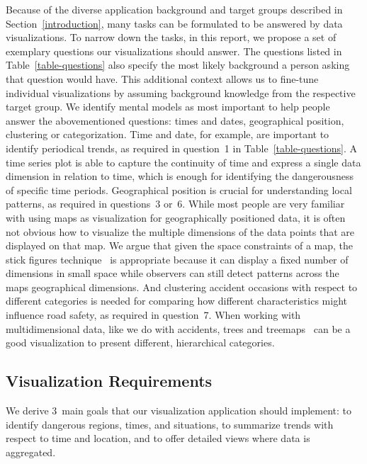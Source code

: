 Because of the diverse application background and target groups described in Section~\ref{introduction}, many tasks can be formulated to be answered by data visualizations. To narrow down the tasks, in this report, we propose a set of exemplary questions our visualizations should answer. The questions listed in Table~\ref{table-questions} also specify the most likely background a person asking that question would have. This additional context allows us to fine-tune individual visualizations by assuming background knowledge from the respective target group.
We identify  mental models as most important to help people answer the abovementioned questions: \Ni times and dates, \Nii geographical position, \Niii clustering or categorization.
Time and date, for example, are important to identify periodical trends, as required in question~1 in Table~\ref{table-questions}. A time series plot is able to capture the continuity of time and express a single data dimension in relation to time, which is enough for identifying the dangerousness of specific time periods.
Geographical position is crucial for understanding local patterns, as required in questions~3 or~6. While most people are very familiar with using maps as visualization for geographically positioned data, it is often not obvious how to visualize the multiple dimensions of the data points that are displayed on that map. We argue that given the space constraints of a map, the stick figures technique~\cite{PickettG1988} is appropriate because it can display a fixed number of dimensions in small space while observers can still detect patterns across the maps geographical dimensions.
And clustering accident occasions with respect to different categories is needed for comparing how different characteristics might influence road safety, as required in question~7. When working with multidimensional data, like we do with accidents, trees and treemaps~\cite{Shneiderman1992} can be a good visualization to present different, hierarchical categories.

\subsection{Visualization Requirements}
\label{requirements}
We derive 3~main goals that our visualization application should implement: \Ni to identify dangerous regions, times, and situations, \Nii to summarize trends with respect to time and location, and \Niii to offer detailed views where data is aggregated.

